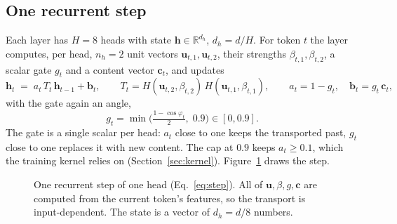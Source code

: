 \documentclass[10pt]{article}
\newcommand{\R}{\mathbb{R}}
\newcommand{\bu}{\mathbf{u}}
\newcommand{\bh}{\mathbf{h}}
\newcommand{\bc}{\mathbf{c}}
\begin{document}
\subsection{One recurrent step}

Each layer has $H=8$ heads with state $\bh\in\R^{d_h}$, $d_h=d/H$. For token $t$ the layer computes, per
head, $n_h=2$ unit vectors $\bu_{t,1},\bu_{t,2}$, their strengths $\beta_{t,1},\beta_{t,2}$, a scalar gate
$g_t$ and a content vector $\bc_t$, and updates
\begin{equation}
  \bh_t \;=\; a_t\, T_t\, \bh_{t-1} + \mathbf{b}_t, \qquad
  T_t = H(\bu_{t,2},\beta_{t,2})\,H(\bu_{t,1},\beta_{t,1}), \qquad
  a_t = 1-g_t,\quad \mathbf{b}_t = g_t\,\bc_t,
  \label{eq:step}
\end{equation}
with the gate again an angle,
\begin{equation}
  g_t = \min\!\Big(\tfrac{1-\cos\varphi_t}{2},\; 0.9\Big)\in[0,0.9].
\end{equation}
The gate is a single scalar per head: $a_t$ close to one keeps the transported past, $g_t$ close to one
replaces it with new content. The cap at $0.9$ keeps $a_t\ge 0.1$, which the training kernel relies on
(Section~\ref{sec:kernel}). Figure~\ref{fig:step} draws the step.

\begin{figure}[t]
\centering
{}
\caption{One recurrent step of one head (Eq.~\ref{eq:step}). All of $\bu,\beta,g,\bc$ are computed from
the current token's features, so the transport is input-dependent. The state is a vector of
$d_h=d/8$ numbers.}
\label{fig:step}
\end{figure}
\end{document}
